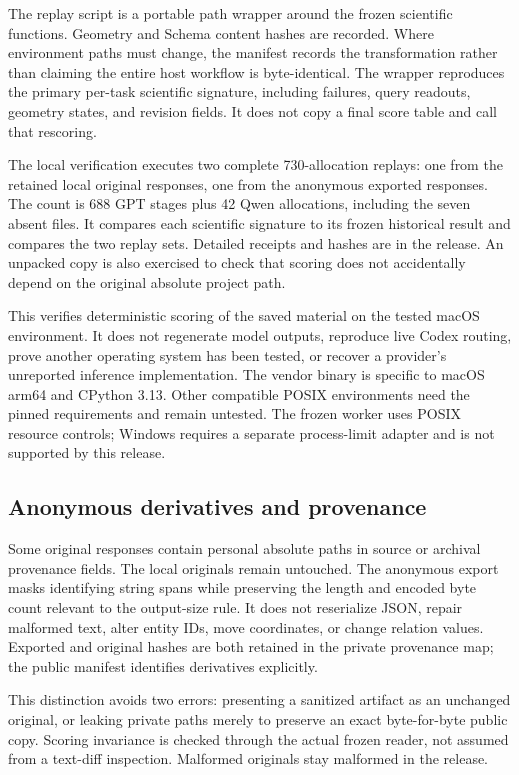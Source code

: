 The replay script is a portable path wrapper around the frozen scientific functions. Geometry and Schema content hashes are recorded. Where environment paths must change, the manifest records the transformation rather than claiming the entire host workflow is byte-identical. The wrapper reproduces the primary per-task scientific signature, including failures, query readouts, geometry states, and revision fields. It does not copy a final score table and call that rescoring.

The local verification executes two complete 730-allocation replays: one from the retained local original responses, one from the anonymous exported responses. The count is 688 GPT stages plus 42 Qwen allocations, including the seven absent files. It compares each scientific signature to its frozen historical result and compares the two replay sets. Detailed receipts and hashes are in the release. An unpacked copy is also exercised to check that scoring does not accidentally depend on the original absolute project path.

This verifies deterministic scoring of the saved material on the tested macOS environment. It does not regenerate model outputs, reproduce live Codex routing, prove another operating system has been tested, or recover a provider's unreported inference implementation. The vendor binary is specific to macOS arm64 and CPython 3.13. Other compatible POSIX environments need the pinned requirements and remain untested. The frozen worker uses POSIX resource controls; Windows requires a separate process-limit adapter and is not supported by this release.

\subsection{Anonymous derivatives and provenance}
Some original responses contain personal absolute paths in source or archival provenance fields. The local originals remain untouched. The anonymous export masks identifying string spans while preserving the length and encoded byte count relevant to the output-size rule. It does not reserialize JSON, repair malformed text, alter entity IDs, move coordinates, or change relation values. Exported and original hashes are both retained in the private provenance map; the public manifest identifies derivatives explicitly.

This distinction avoids two errors: presenting a sanitized artifact as an unchanged original, or leaking private paths merely to preserve an exact byte-for-byte public copy. Scoring invariance is checked through the actual frozen reader, not assumed from a text-diff inspection. Malformed originals stay malformed in the release.

